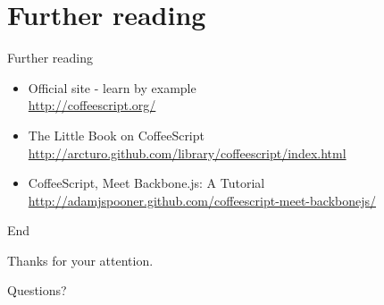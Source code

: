 \documentclass[xcolor=dvipsnames]{beamer}
\newcommand{\slide}[1]{\begin{frame}[fragile]{{#1}}}
\begin{document}
\section{Further reading}
\slide{Further reading}
    \begin{itemize}
        \item Official site - learn by example \\
            \url{http://coffeescript.org/}
        \item The Little Book on CoffeeScript \\
            \url{http://arcturo.github.com/library/coffeescript/index.html}
        \item CoffeeScript, Meet Backbone.js: A Tutorial \\
            \url{http://adamjspooner.github.com/coffeescript-meet-backbonejs/}
    \end{itemize}
\end{frame}


\slide{End}
    \begin{center}
        Thanks for your attention.
        
        \vspace{2 cm}
        \pause
        Questions?
    \end{center}
\end{frame}
\end{document}
